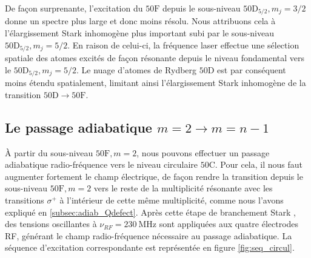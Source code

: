 De façon surprenante, l'excitation du $\mathrm{50F}$ depuis le sous-niveau $\mathrm{50D}_{5/2}, m_j = 3/2$ donne un spectre plus large et donc moins résolu.
Nous attribuons cela à l'élargissement Stark inhomogène plus important subi par le sous-niveau $\mathrm{50D}_{5/2}, m_j = 5/2$.
En raison de celui-ci, la fréquence laser effectue une sélection spatiale des atomes excités de façon résonante depuis le niveau fondamental vers le $\mathrm{50D}_{5/2}, m_j = 5/2$.
Le nuage d'atomes de Rydberg $\mathrm{50D}$ est par conséquent moins étendu spatialement, limitant ainsi l'élargissement Stark inhomogène de la transition $\mathrm{50D}\rightarrow\mathrm{50F}$.

\newpage
	\subsection{Le passage adiabatique $m=2\rightarrow m=n-1$}
\noindent \`A partir du sous-niveau $\mathrm{50F},m=2$, nous pouvons effectuer un passage adiabatique radio-fréquence vers le niveau circulaire $\mathrm{50C}$.
Pour cela, il nous faut augmenter fortement le champ électrique, de façon rendre la transition depuis le sous-niveau $\mathrm{50F},m=2$ vers le reste de la multiplicité résonante avec les transitions $\sigma^+$ à l'intérieur de cette même multiplicité, comme nous l'avons expliqué en \ref{subsec:adiab_Qdefect}.
Après cette étape de \og branchement Stark \fg{}, des tensions oscillantes à $\nu_{RF} = \SI{230}{\MHz}$ sont appliquées aux quatre électrodes RF, générant le champ radio-fréquence nécessaire au passage adiabatique.
La séquence d'excitation correspondante est représentée en figure \eqref{fig:seq_circul}.

